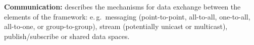 \documentclass[conference,final]{IEEEtran}
\newcommand{\alnote}[1]{ {\textcolor{blue} { ***andre: #1 }}}
\newcommand{\alnote}[1]{}
\begin{document}

% 




\textbf{Communication:} describes the mechanisms for data exchange
between the elements of the framework: e.\,g.\ messaging 
(point-to-point, all-to-all, one-to-all, all-to-one, or
group-to-group), stream (potentially unicast or multicast),
publish/subscribe or shared data spaces. 
		
\end{document}
